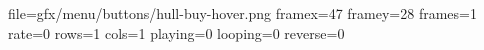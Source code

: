 file=gfx/menu/buttons/hull-buy-hover.png
framex=47
framey=28
frames=1
rate=0
rows=1
cols=1
playing=0
looping=0
reverse=0